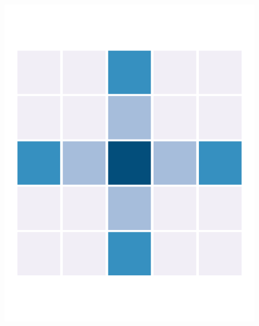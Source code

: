 \begin{figure}
    \begin{minipage}[b]{.22\linewidth}
       \includegraphics[width=\linewidth,trim={0.7cm 2.2cm 0.7cm 2.2cm},clip]{body/figures/62-nb_z.pdf}
    \end{minipage}
    \hfill
    \begin{minipage}[b]{.22\linewidth}

\end{minipage}
\end{figure}
